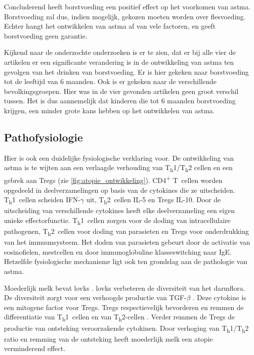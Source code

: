 \documentclass[table,abstract=true]{scrartcl}
\begin{document}
Concluderend heeft borstvoeding een positief effect op het voorkomen van astma. Borstvoeding zal dus, indien mogelijk, gekozen moeten worden over flesvoeding. Echter hangt het ontwikkelen van astma af van vele factoren, en geeft borstvoeding geen garantie. 


Kijkend naar de onderzochte onderzoeken is er te zien, dat er bij alle vier de artikelen er een significante verandering is in de ontwikkeling van astma ten gevolgen van het drinken van borstvoeding. Er is hier gekeken naar borstvoeding tot de leeftijd van 6 maanden. Ook is er gekeken naar de verschillende bevolkingsgroepen. Hier was in de vier gevonden artikelen geen groot verschil tussen. Het is dus aannemelijk dat kinderen die tot 6 maanden borstvoeding krijgen, een minder grote kans hebben op het ontwikkelen van astma.


\subsection{Pathofysiologie}
Hier is ook een duidelijke fysiologische verklaring voor.
De ontwikkeling van astma is te wijten aan een verlaagde verhouding van T\textsubscript{h}1/T\textsubscript{h}2 cellen en een gebrek aan Tregs (zie \cref{fig:atopie_ontwikkeling}). CD4\textsuperscript{+} T~cellen worden opgedeeld in deelverzamelingen op basis van de cytokines die ze uitscheiden. T\textsubscript{h}1~cellen scheiden IFN-$\gamma$ uit, T\textsubscript{h}2~cellen IL-5 en Tregs IL-10. Door de uitscheiding van verschillende cytokines heeft elke deelverzameling een eigen unieke effectorfunctie. T\textsubscript{h}1~cellen zorgen voor de doding van intracellulaire pathogenen, T\textsubscript{h}2~cellen voor doding van parasieten en Tregs voor onderdrukking van het immuunsysteem. Het doden van parasieten gebeurt door de activatie van eosinofielen, mestcellen en door immunoglobuline klasseswitching naar IgE. Hetzelfde fysiologische mechanisme ligt ook ten grondslag aan de pathologie van astma.

Moederlijk melk bevat \glspl{lovk} \cite{das2002essential}. \Glspl{lovk} verbeteren de diversiteit van het darmflora. De diversiteit zorgt voor een verhoogde productie van TGF-$\beta$ \cite{das2002essential,Das_2004}. Deze cytokine is een mitogene factor voor Tregs. Tregs respectievelijk bevorderen en remmen de differentiatie van T\textsubscript{h}1~cellen en van T\textsubscript{h}2-cellen \cite{penttila2010milk}. Verder remmen de Tregs de productie van ontsteking veroorzakende cytokinen. Door verhoging van T\textsubscript{h}1/T\textsubscript{h}2 ratio en remming van de ontsteking heeft moederlijk melk een atopie verminderend effect.
\end{document}
